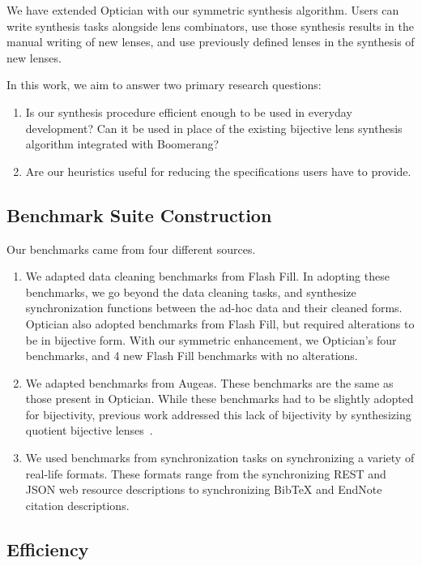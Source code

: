 \documentclass[acmsmall,screen,anonymous]{acmart}
\begin{document}
We have extended Optician with our symmetric synthesis algorithm. Users can
write synthesis tasks alongside lens combinators, use those synthesis results in
the manual writing of new lenses, and use previously defined lenses in the
synthesis of new lenses.

In this work, we aim to answer two primary research questions:
\begin{enumerate}
\item Is our synthesis procedure efficient enough to be used in everyday
  development?  Can it be used in place of the existing bijective lens synthesis
  algorithm integrated with Boomerang?
\item Are our heuristics useful for reducing the specifications users have to
  provide.
\end{enumerate}

\subsection{Benchmark Suite Construction}
Our benchmarks came from four different sources.
\begin{enumerate}
\item We adapted  data cleaning benchmarks from Flash Fill. In adopting
  these benchmarks, we go beyond the data cleaning tasks, and synthesize
  synchronization functions between the ad-hoc data and their cleaned forms.
  Optician also adopted benchmarks from Flash Fill, but required alterations to
  be in bijective form. With our symmetric enhancement, we Optician's four
  benchmarks, and 4 new Flash Fill benchmarks with no alterations.
\item We adapted  benchmarks from Augeas.  These benchmarks are the same
  as those present in Optician.  While these benchmarks had to be slightly
  adopted for bijectivity, previous work addressed this lack of bijectivity by
  synthesizing quotient bijective lenses~\cite{?}.
\item We used  benchmarks from synchronization tasks on synchronizing a
  variety of real-life formats. These formats range from the synchronizing REST
  and JSON web resource descriptions to synchronizing BibTeX and EndNote
  citation descriptions.
\end{enumerate}

\subsection{Efficiency}
\end{document}
